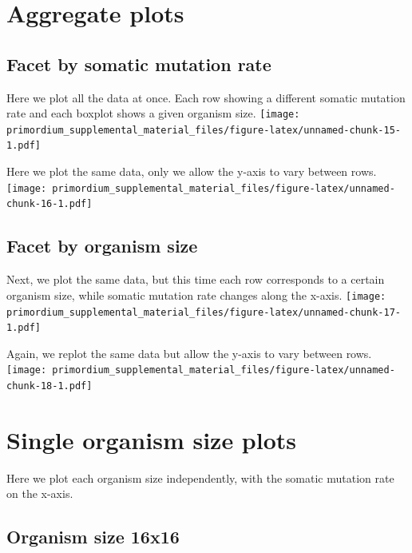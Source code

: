 \documentclass[]{book}
\begin{document}
\hypertarget{aggregate-plots-1}{%
\section{Aggregate plots}\label{aggregate-plots-1}}

\hypertarget{facet-by-somatic-mutation-rate}{%
\subsection{Facet by somatic mutation rate}\label{facet-by-somatic-mutation-rate}}

Here we plot all the data at once.
Each row showing a different somatic mutation rate and each boxplot shows a given organism size.
\texttt{[image: primordium\_supplemental\_material\_files/figure-latex/unnamed-chunk-15-1.pdf]}

Here we plot the same data, only we allow the y-axis to vary between rows.
\texttt{[image: primordium\_supplemental\_material\_files/figure-latex/unnamed-chunk-16-1.pdf]}

\hypertarget{facet-by-organism-size}{%
\subsection{Facet by organism size}\label{facet-by-organism-size}}

Next, we plot the same data, but this time each row corresponds to a certain organism size, while somatic mutation rate changes along the x-axis.
\texttt{[image: primordium\_supplemental\_material\_files/figure-latex/unnamed-chunk-17-1.pdf]}

Again, we replot the same data but allow the y-axis to vary between rows.
\texttt{[image: primordium\_supplemental\_material\_files/figure-latex/unnamed-chunk-18-1.pdf]}

\hypertarget{single-organism-size-plots}{%
\section{Single organism size plots}\label{single-organism-size-plots}}

Here we plot each organism size independently, with the somatic mutation rate on the x-axis.

\hypertarget{organism-size-16x16}{%
\subsection{Organism size 16x16}\label{organism-size-16x16}}
\end{document}
